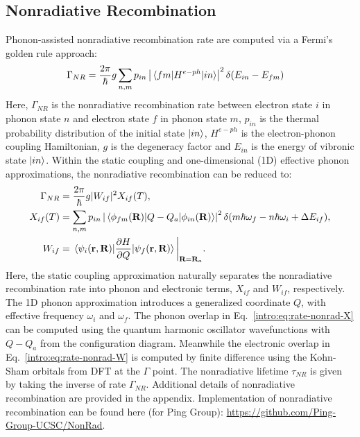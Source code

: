 \subsection{Nonradiative Recombination}
Phonon-assisted nonradiative recombination rate are computed via a Fermi's golden rule approach:
\begin{align}
    \Gamma_{NR} &= \frac{2\pi}{\hbar}g\sum_{n,m}p_{in}\left|\mel{fm}{H^{e-ph}}{in}\right|^2\delta(E_{in}-E_{fm}) \label{intro:eq:nonrad-full}
\end{align}
Here, $\Gamma_{NR}$ is the nonradiative recombination rate between electron state $i$ in phonon state $n$ and electron state $f$ in phonon state $m$, $p_{in}$ is the thermal probability distribution of the initial state $\ket{in}$, $H^{e-ph}$ is the electron-phonon coupling Hamiltonian, $g$ is the degeneracy factor and $E_{in}$ is the energy of vibronic state $\ket{in}$. Within the static coupling and one-dimensional (1D) effective phonon approximations, the nonradiative recombination can be reduced to:
\begin{align}
    \Gamma_{NR} &= \frac{2\pi}{\hbar}g|W_{if}|^2 X_{if}(T), \label{intro:eq:nonrad}\\
    X_{if}(T) &= \sum_{n,m}p_{in}\left|\mel{\phi_{fm}(\textbf{R})}{Q-Q_a}{\phi_{in}(\mathbf{R})}\right|^2 \delta(m\hbar\omega_f - n\hbar\omega_i+\Delta E_{if}), \label{intro:eq:nonrad-X} \\
    W_{if} &= \mel{\psi_i(\mathbf{r}, \textbf{R})}{\frac{\partial H}{\partial Q}}{\psi_f(\mathbf{r},\textbf{R})}\bigg{|}_{\textbf{R}=\textbf{R}_a}. \label{intro:eq:nonrad-W}
\end{align}
Here, the static coupling approximation naturally separates the nonradiative recombination rate into phonon and electronic terms, $X_{if}$ and $W_{if}$, respectively. The 1D phonon approximation introduces a generalized coordinate $Q$, with effective frequency $\omega_i$ and $\omega_f$. The phonon overlap in Eq.~\ref{intro:eq:rate-nonrad-X} can be computed using the quantum harmonic oscillator wavefunctions with $Q-Q_a$ from the configuration diagram. Meanwhile the electronic overlap in Eq.~\ref{intro:eq:rate-nonrad-W} is computed by finite difference using the Kohn-Sham orbitals from DFT at the $\Gamma$ point. The nonradiative lifetime $\tau_{NR}$ is given by taking the inverse of rate $\Gamma_{NR}$. Additional details of nonradiative recombination are provided in the appendix. Implementation of nonradiative recombination can be found here (for Ping Group): \url{https://github.com/Ping-Group-UCSC/NonRad}.


